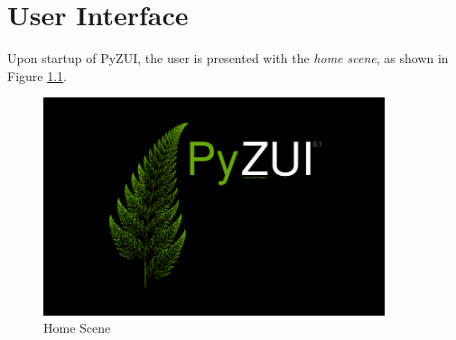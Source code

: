 \documentclass{report}
\begin{document}
  \chapter{User Interface}
  Upon startup of PyZUI, the user is presented with the \emph{home scene}, as
  shown in Figure \ref{fig:home_scene}.

  \begin{figure}[h!]
  \begin{center}
    \includegraphics[width=10cm]{../images/home_scene.png}
    \caption{Home Scene} \label{fig:home_scene}
  \end{center}
  \end{figure}
\end{document}
